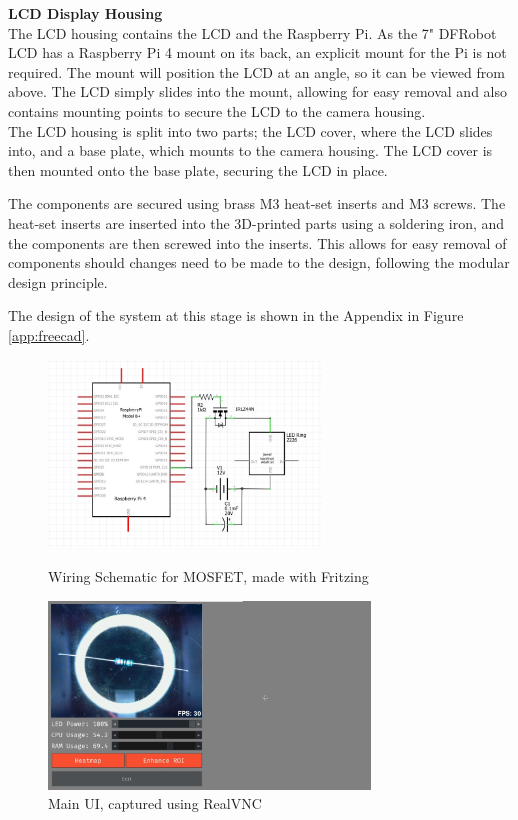 \noindent
\textbf{LCD Display Housing}
\label{sec:lcdhousing} \\
The LCD housing contains the LCD and the Raspberry Pi. As the 7" DFRobot LCD has a Raspberry Pi 4 mount on its back,
an explicit mount for the Pi is not required. The mount will position the LCD at an angle, so it can be viewed from above. The LCD
simply slides into the mount, allowing for easy removal and also contains mounting points to secure the LCD to the camera housing. \\
The LCD housing is split into two parts; the LCD cover, where the LCD slides into, and a base plate, which mounts to the camera housing.
The LCD cover is then mounted onto the base plate, securing the LCD in place.

The components are secured using brass M3 heat-set inserts and M3 screws. The heat-set inserts are inserted into the 3D-printed parts using a soldering iron,
and the components are then screwed into the inserts. This allows for easy removal of components should changes need to be made to the design, following
the modular design principle.

The design of the system at this stage is shown in the Appendix in Figure \ref{app:freecad}.
\begin{figure}
    \begin{minipage}[t]{0.49\textwidth}
      \centering
      \includegraphics[width=\textwidth,height=5cm, keepaspectratio]{imgs/diagrams/wiring.jpg}
      \caption{Wiring Schematic for MOSFET, made with Fritzing \cite{fritzing}}
      \label{fig:wiringschematic}
    \end{minipage}
    \hfill
    \begin{minipage}[t]{0.49\textwidth}
        \centering
        \includegraphics[width=\textwidth,height=5cm, keepaspectratio]{imgs/software/realvnc.jpg}
        \caption{Main UI, captured using RealVNC \cite{realvnc}}
        \label{fig:mainui}
    \end{minipage}
  \end{figure}
  